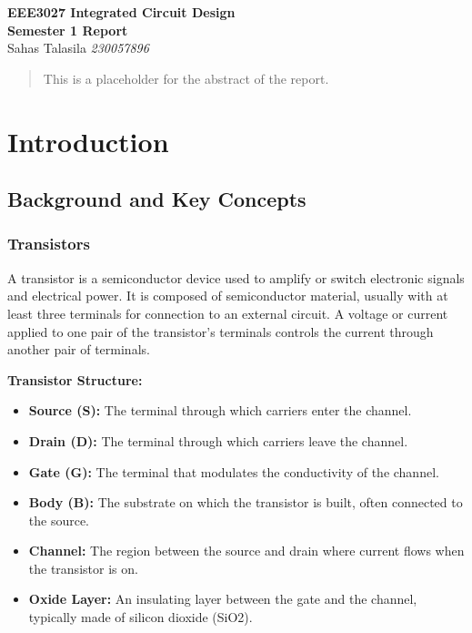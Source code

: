 \documentclass[a4paper,12pt]{article}
\begin{document}
\begin{titlepage}
    \centering
    \vspace*{2cm}
    \Huge{\textbf{EEE3027 Integrated Circuit Design}}\\[0.5cm]
    \Large{\textbf{Semester 1 Report}}\\ 
    \Large{Sahas Talasila \textit{230057896}}
    \vfill
\end{titlepage}

\tableofcontents
\newpage

\begin{abstract}
    This is a placeholder for the abstract of the report.
\end{abstract}

\section{Introduction}

\subsection{Background and Key Concepts}

\subsubsection{Transistors}
A transistor is a semiconductor device used to amplify or switch electronic signals and electrical power. 
It is composed of semiconductor material, usually with at least three terminals for connection to an external circuit. A voltage or current applied to one pair of the transistor's terminals controls the current through another pair of terminals.

\textbf{Transistor Structure:}

\begin{itemize}
    \item \textbf{Source (S):} The terminal through which carriers enter the channel.
    \item \textbf{Drain (D):} The terminal through which carriers leave the channel.
    \item \textbf{Gate (G):} The terminal that modulates the conductivity of the channel.
    \item \textbf{Body (B):} The substrate on which the transistor is built, often connected to the source.
    \item \textbf{Channel:} The region between the source and drain where current flows when the transistor is on.  
    \item \textbf{Oxide Layer:} An insulating layer between the gate and the channel, typically made of silicon dioxide (SiO2).
\end{itemize}
\end{document}
